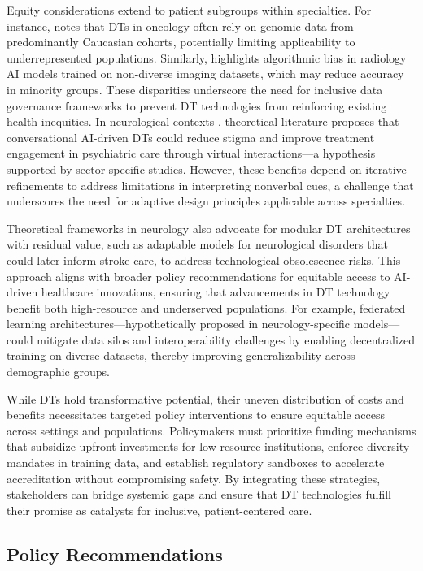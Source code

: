 \documentclass[10pt,a4paper]{article}
\begin{document}
Equity considerations extend to patient subgroups within specialties. For instance, \cite{Wang2025} notes that DTs in oncology often rely on genomic data from predominantly Caucasian cohorts, potentially limiting applicability to underrepresented populations. Similarly, \cite{Bocean2025} highlights algorithmic bias in radiology AI models trained on non-diverse imaging datasets, which may reduce accuracy in minority groups. These disparities underscore the need for inclusive data governance frameworks to prevent DT technologies from reinforcing existing health inequities. In neurological contexts , theoretical literature proposes that conversational AI-driven DTs could reduce stigma and improve treatment engagement in psychiatric care through virtual interactions—a hypothesis supported by sector-specific studies. However, these benefits depend on iterative refinements to address limitations in interpreting nonverbal cues, a challenge that underscores the need for adaptive design principles applicable across specialties.


Theoretical frameworks in neurology also advocate for modular DT architectures with residual value, such as adaptable models for neurological disorders that could later inform stroke care, to address technological obsolescence risks. This approach aligns with broader policy recommendations for equitable access to AI-driven healthcare innovations, ensuring that advancements in DT technology benefit both high-resource and underserved populations. For example, federated learning architectures—hypothetically proposed in neurology-specific models—could mitigate data silos and interoperability challenges by enabling decentralized training on diverse datasets, thereby improving generalizability across demographic groups.

While DTs hold transformative potential, their uneven distribution of costs and benefits necessitates targeted policy interventions to ensure equitable access across settings and populations. Policymakers must prioritize funding mechanisms that subsidize upfront investments for low-resource institutions, enforce diversity mandates in training data, and establish regulatory sandboxes to accelerate accreditation without compromising safety. By integrating these strategies, stakeholders can bridge systemic gaps and ensure that DT technologies fulfill their promise as catalysts for inclusive, patient-centered care.

\subsection*{Policy Recommendations}
\end{document}
